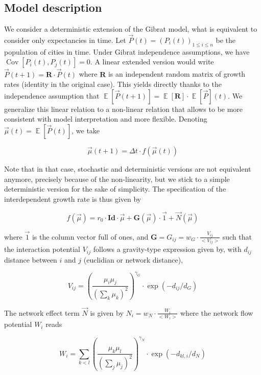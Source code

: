 \documentclass[Royal,sageh,times]{sagej}
\DeclareMathOperator{\Cov}{Cov}
\DeclareMathOperator{\E}{\mathbb{E}}
\newcommand{\Covb}[2]{\ensuremath{\Cov\!\left[#1,#2\right]}}
\newcommand{\Eb}[1]{\ensuremath{\E\!\left[#1\right]}}
\begin{document}
\subsection*{Model description}

We consider a deterministic extension of the Gibrat model, what is equivalent to consider only expectancies in time. Let $\vec{P}(t)=(P_i(t))_{1\leq i\leq n}$ be the population of cities in time. Under Gibrat independence assumptions, we have $\Covb{P_i(t)}{P_j(t)}=0$. A linear extended version would write $\vec{P}(t+1)=\mathbf{R}\cdot \vec{P}(t)$ where $\mathbf{R}$ is an independent random matrix of growth rates (identity in the original case). This yields directly thanks to the independence assumption that $\Eb{\vec{P}(t+1)}=\Eb{\mathbf{R}}\cdot\Eb{\vec{P}}(t)$. We generalize this linear relation to a non-linear relation that allows to be more consistent with model interpretation and more flexible. Denoting $\vec{\mu}(t)=\Eb{\vec{P}(t)}$, we take

\begin{equation}
	\vec{\mu}(t+1)=\Delta t\cdot f(\vec{\mu}(t))
\end{equation}

Note that in that case, stochastic and deterministic versions are not equivalent anymore, precisely because of the non-linearity, but we stick to a simple deterministic version for the sake of simplicity. The specification of the interdependent growth rate is thus given by

\begin{equation}
f(\vec{\mu}) = r_0\cdot \mathbf{Id}\cdot \vec{\mu} + \mathbf{G}\left(\vec{\mu}\right)\cdot \vec{1} + \vec{N}\left(\vec{\mu}\right)
\end{equation}


where $\vec{1}$ is the column vector full of ones, and $\mathbf{G} = G_{ij} = w_G\cdot \frac{V_{ij}}{<V_{ij}>}$ such that the interaction potential $V_{ij}$ follows a gravity-type expression given by, with $d_{ij}$ distance between $i$ and $j$ (euclidian or network distance),

\begin{equation}
V_{ij} = \left(\frac{\mu_i\mu_j}{\left(\sum_k{\mu_k}\right)^2}\right)^{\gamma_G}\cdot \exp{\left(-d_{ij}/d_G\right)}
\end{equation}

The network effect term $\vec{N}$ is given by $N_{i} = w_N \cdot \frac{W_i}{<W_i>}$ where the network flow potential $W_i$ reads

\begin{equation}
W_{i} = \sum_{k < l} \left(\frac{\mu_k\mu_l}{\left(\sum_j\mu_j\right)^2}\right)^{\gamma_N} \cdot \exp{\left(-d_{kl,i}/d_N\right)}
\end{equation}
\end{document}
